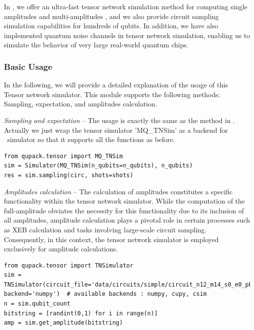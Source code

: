 In \QuPack, we offer an ultra-fast tensor network simulation method for computing single amplitudes and multi-amplitudes \cite{kalachev2022multitensor}, and we also provide circuit sampling simulation capabilities for hundreds of qubits. In addition, we have also implemented quantum noise channels in tensor network simulation, enabling us to simulate the behavior of very large real-world quantum chips.

\subsubsection{Basic Usage}
In the following, we will provide a detailed explanation of the usage of this Tensor network simulator.
This module supports the following methods: Sampling,  expectation, and amplitudes calculation.

\textit{Sampling and expectation} -- The usage is exactly the same as the method in \MindQuantum. Actually we just wrap the tensor simulator 'MQ\_TNSim' as a backend for \MindQuantum \  simulator so that it supports all the functions as before.
\begin{lstlisting}
from qupack.tensor import MQ_TNSim
sim = Simulator(MQ_TNSim(n_qubits=n_qubits), n_qubits)
res = sim.sampling(circ, shots=shots)
\end{lstlisting}

\textit{Amplitudes calculation} -- The calculation of amplitudes constitutes a specific functionality within the tensor network simulator. While the computation of the full-amplitude obviates the necessity for this functionality due to its inclusion of all amplitudes, amplitude calculation plays a pivotal role in certain processes such as XEB calculation and tasks involving large-scale circuit sampling. Consequently, in this context, the tensor network simulator  is employed exclusively for amplitude calculations.

\begin{lstlisting}
from qupack.tensor import TNSimulator
sim = TNSimulator(circuit_file='data/circuits/simple/circuit_n12_m14_s0_e0_pEFGH.qsim', backend='numpy')  # available backends : numpy, cupy, csim
n = sim.qubit_count
bitstring = [randint(0,1) for i in range(n)]
amp = sim.get_amplitude(bitstring)
\end{lstlisting}

